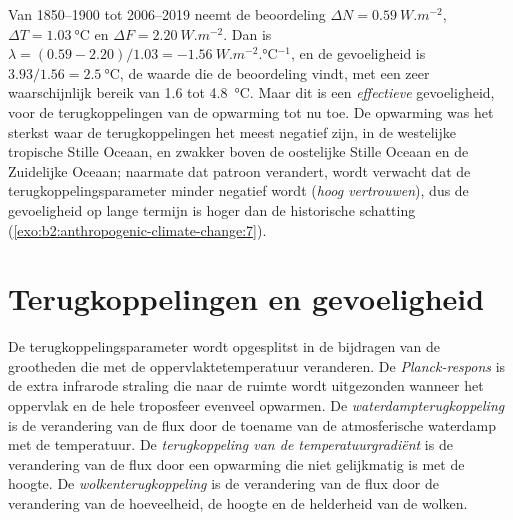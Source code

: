 Van 1850--1900 tot 2006--2019 neemt de beoordeling $\Delta N = \qty{0.59}{W.m^{-2}}$, $\Delta T =
\qty{1.03}{\celsius}$ en $\Delta F = \qty{2.20}{W.m^{-2}}$. Dan is $\lambda = (0.59 - 2.20)/1.03 =
\qty{-1.56}{W.m^{-2}.\celsius^{-1}}$, en de gevoeligheid is $3.93/1.56 = \qty{2.5}{\celsius}$,
de waarde die de beoordeling vindt, met een zeer waarschijnlijk bereik van 1.6 tot \qty{4.8}{\celsius}. Maar dit is
een \emph{effectieve} gevoeligheid, voor de terugkoppelingen van de opwarming tot nu toe. De opwarming was
het sterkst waar de terugkoppelingen het meest negatief zijn, in de westelijke tropische Stille Oceaan, en zwakker boven de
oostelijke Stille Oceaan en de Zuidelijke Oceaan; naarmate dat patroon verandert, wordt verwacht dat de terugkoppelingsparameter
minder negatief wordt (\emph{hoog vertrouwen}), dus de gevoeligheid op lange termijn is hoger dan de
historische schatting (\cref{exo:b2:anthropogenic-climate-change:7}).

\section{Terugkoppelingen en gevoeligheid}\label{sec:b2:anthropogenic-climate-change:feedbacks}

\begin{definition}\label{def:b2:anthropogenic-climate-change:feedbacks}
De terugkoppelingsparameter wordt opgesplitst in de bijdragen van de grootheden die met de
oppervlaktetemperatuur veranderen. De \emph{Planck-respons} is de extra infrarode straling die
naar de ruimte wordt uitgezonden wanneer het oppervlak en de hele troposfeer evenveel opwarmen. De
\emph{waterdampterugkoppeling} is de verandering van de flux door de toename
van de atmosferische waterdamp met de temperatuur. De \emph{terugkoppeling van de temperatuurgradiënt}
is de verandering van de flux door een opwarming die niet gelijkmatig is met de hoogte. De
\emph{wolkenterugkoppeling} is de verandering van de flux door de verandering van de hoeveelheid, de hoogte en
de helderheid van de wolken.
\end{definition}

